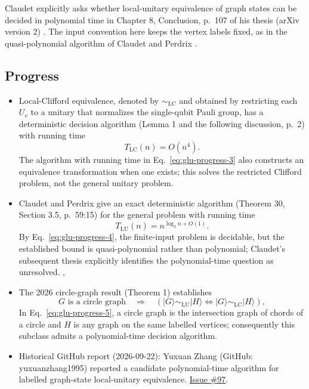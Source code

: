 Claudet explicitly asks whether local-unitary equivalence of graph states can be decided in polynomial time in Chapter 8, Conclusion, p.~107 of his thesis (arXiv version 2) . The input convention here keeps the vertex labels fixed, as in the quasi-polynomial algorithm of Claudet and Perdrix .

\subsection*{Progress}

\begin{itemize}
  \item Local-Clifford equivalence, denoted by $\sim_{\mathrm{LC}}$ and obtained by restricting each $U_v$ to a unitary that normalizes the single-qubit Pauli group, has a deterministic decision algorithm (Lemma 1 and the following discussion, p.~2) with running time
  \begin{equation}
T_{\mathrm{LC}}(n)=O(n^4).
\label{eq:glu-progress-3}
\end{equation}
  The algorithm with running time in Eq.~\eqref{eq:glu-progress-3} also constructs an equivalence transformation when one exists; this solves the restricted Clifford problem, not the general unitary problem. 

  \item Claudet and Perdrix give an exact deterministic algorithm (Theorem 30, Section 3.5, p.~59:15) for the general problem with running time
  \begin{equation}
T_{\mathrm{LU}}(n)=n^{\log_2 n+O(1)}.
\label{eq:glu-progress-4}
\end{equation}
  By Eq.~\eqref{eq:glu-progress-4}, the finite-input problem is decidable, but the established bound is quasi-polynomial rather than polynomial; Claudet's subsequent thesis explicitly identifies the polynomial-time question as unresolved. , 

  \item The 2026 circle-graph result (Theorem 1) establishes
  \begin{equation}
G\text{ is a circle graph}
  \quad\Longrightarrow\quad
  \left(|G\rangle\sim_{\mathrm{LU}}|H\rangle
  \Longleftrightarrow
  |G\rangle\sim_{\mathrm{LC}}|H\rangle\right),
\label{eq:glu-progress-5}
\end{equation}
  In Eq.~\eqref{eq:glu-progress-5}, a circle graph is the intersection graph of chords of a circle and $H$ is any graph on the same labelled vertices; consequently this subclass admits a polynomial-time decision algorithm. 

  \item Historical GitHub report (2026-09-22): Yuxuan Zhang (GitHub: yuxuanzhang1995) reported a candidate polynomial-time algorithm for labelled graph-state local-unitary equivalence. \href{https://github.com/Naixu-Guo/quantum-open-problems/issues/97}{Issue \#97}.
\end{itemize}

